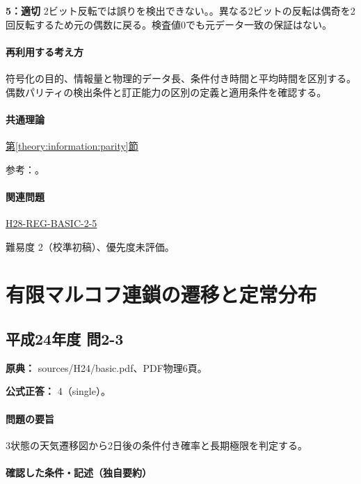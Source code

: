 \noindent\textbf{5：適切} 2ビット反転では誤りを検出できない。。異なる2ビットの反転は偶奇を2回反転するため元の偶数に戻る。検査値0でも元データ一致の保証はない。\par

\paragraph{再利用する考え方} 符号化の目的、情報量と物理的データ長、条件付き時間と平均時間を区別する。偶数パリティの検出条件と訂正能力の区別の定義と適用条件を確認する。

\paragraph{共通理論} \hyperref[theory:information:parity]{第\ref*{theory:information:parity}節}

\par 参考：\cite{info_errors}。

\paragraph{関連問題} \hyperref[q:h28-reg-basic-2-5]{H28-REG-BASIC-2-5}

\par 難易度 2（校準初稿）、優先度未評価。

\section{有限マルコフ連鎖の遷移と定常分布}

\subsection{平成24年度 問2-3}
\label{q:h24-reg-basic-2-3}

\noindent\textbf{原典：} sources/H24/basic.pdf、PDF物理6頁。

\textbf{公式正答：} 4（single）。

\paragraph{問題の要旨} 3状態の天気遷移図から2日後の条件付き確率と長期極限を判定する。

\paragraph{確認した条件・記述（独自要約）}\mbox{}\par

